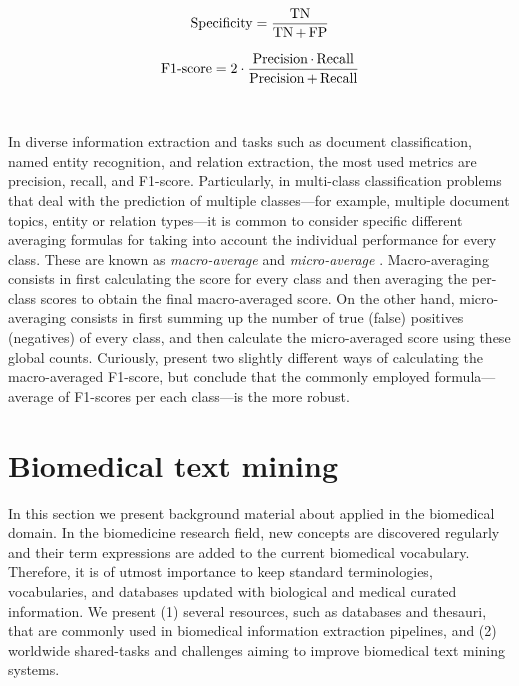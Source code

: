 \begin{equation}
\label{eq:specificity}
\mathop{\mathrm{Specificity}}\nolimits = \frac{\mathop{\mathrm{TN}}\nolimits}{\mathop{\mathrm{TN}}\nolimits + \mathop{\mathrm{FP}}\nolimits}
\end{equation}

\begin{equation}
\label{eq:f-score}
\mathop{\mathrm{F1\hbox{-}score}}\nolimits = 2 \cdot \frac{\mathop{\mathrm{Precision}}\nolimits \cdot \mathop{\mathrm{Recall}}\nolimits}{\mathop{\mathrm{Precision}}\nolimits + \mathop{\mathrm{Recall}}\nolimits}
\end{equation}

~

In diverse information extraction and  tasks such as document classification, named entity recognition, and relation extraction, the most used metrics are precision, recall, and F1-score.
Particularly, in multi-class classification problems that deal with the prediction of multiple classes---for example, multiple document topics, entity or relation types---it is common to consider specific different averaging formulas for taking into account the individual performance for every class.
These are known as \textit{macro-average} and \textit{micro-average} \parencite{yang1999a,tsoumakas2009a}.
Macro-averaging consists in first calculating the score for every class and then averaging the per-class scores to obtain the final macro-averaged score.
On the other hand, micro-averaging consists in first summing up the number of true (false) positives (negatives) of every class, and then calculate the micro-averaged score using these global counts.
Curiously, \textcite{opitz2019a} present two slightly different ways of calculating the macro-averaged F1-score, but conclude that the commonly employed formula---average of F1-scores per each class---is the more robust.


\section{Biomedical text mining}
\label{c2:s:biomedical-text-mining}

In this section we present background material about  applied in the biomedical domain.
In the biomedicine research field, new concepts are discovered regularly and their term expressions are added to the current biomedical vocabulary.
Therefore, it is of utmost importance to keep standard terminologies, vocabularies, and databases updated with biological and medical curated information.
We present (1) several resources, such as databases and thesauri, that are commonly used in biomedical information extraction pipelines, and (2) worldwide shared-tasks and challenges aiming to improve biomedical text mining systems.

